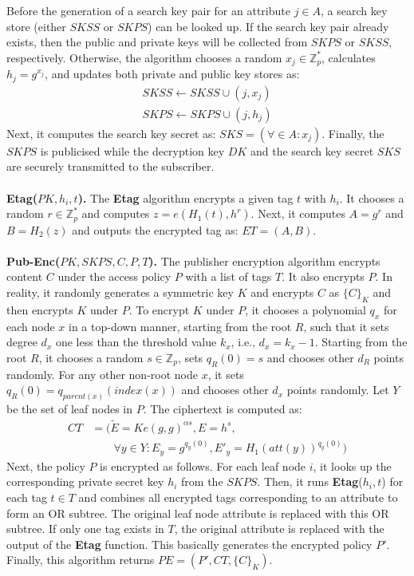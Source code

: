 \documentclass[epsfig,a4paper,11pt,titlepage]{book}
\numberwithin{algorithm}{chapter}
\begin{document}
Before the generation of a search key pair for an attribute $j \in A$, a search key store (either $SKSS$ or $SKPS$) can be looked up. If the search key pair already exists, then the public and private keys will be collected from $SKPS$ or $SKSS$, respectively. Otherwise, the algorithm chooses a random $x_j \in \mathbb{Z}_p^*$, calculates $h_j = g^{x_j}$, and updates both private and public key stores as:
\begin{align*}
SKSS \leftarrow SKSS \cup (j, x_j) \\ 
SKPS \leftarrow SKPS \cup (j, h_j)
\end{align*}
Next, it computes the search key secret as: $SKS = (\forall \in A: x_j)$. Finally, the $SKPS$ is publicised while the decryption key $DK$ and the search key secret $SKS$ are securely transmitted to the subscriber. \\ \\
\textbf{Etag($PK, h_i, t$).} The \textbf{Etag} algorithm encrypts a given tag $t$ with $h_i$. It chooses a random $r \in \mathbb{Z}_p^*$ and computes $z = e(H_1 (t), h^r)$. 
Next, it computes $A = g^r$ and $B = H_2 (z)$ and outputs the encrypted tag as: $ET=(A, B)$. \\ \\
\textbf{Pub-Enc($PK, SKPS, C, P, T$).} The publisher encryption algorithm encrypts content $C$ under the access policy $P$ with a list of tags $T$. It also encrypts $P$. In reality, it randomly generates a symmetric key $K$ and encrypts $C$ as $\{C\}_K$ and then encrypts $K$ under $P$. To encrypt $K$ under $P$, it chooses a polynomial $q_x$ for each node $x$ in a top-down manner, starting from the root $R$, such that it sets degree $d_x$ one less than the threshold value $k_x$, i.e., $d_x = k_x - 1$. Starting from the root $R$, it chooses a random $s \in \mathbb{Z}_p$, sets $q_R (0) = s$ and chooses other $d_R$ points randomly. For any other non-root node $x$, it sets $q_R (0) = q_{parent(x)} (index(x))$ and chooses other $d_x$ points randomly. Let $Y$ be the set of leaf nodes in $P$. 
The ciphertext is computed as: 
\begin{align*}
CT &= (\tilde{E} = Ke(g,g)^{\alpha s}, E = h^s, \\
&\qquad {} \forall y \in Y: E_y = g^{q_y (0)}, E'_y = H_1 (att(y))^{q_y (0)})
\end{align*}
Next, the policy $P$ is encrypted as follows. For each leaf node $i$, it looks up the corresponding private secret key $h_i$ from the $SKPS$. Then, it runs \textbf{Etag}($h_i, t$) for each tag $t \in T$ and combines all encrypted tags corresponding to an attribute to form an OR subtree. The original leaf node attribute is replaced with this OR subtree. If only one tag exists in $T$, the original attribute is replaced with the output of the \textbf{Etag} function. This basically generates the encrypted policy $P'$. Finally, this algorithm returns $PE = (P', CT, \{C\}_K)$. \\ \\
\end{document}
